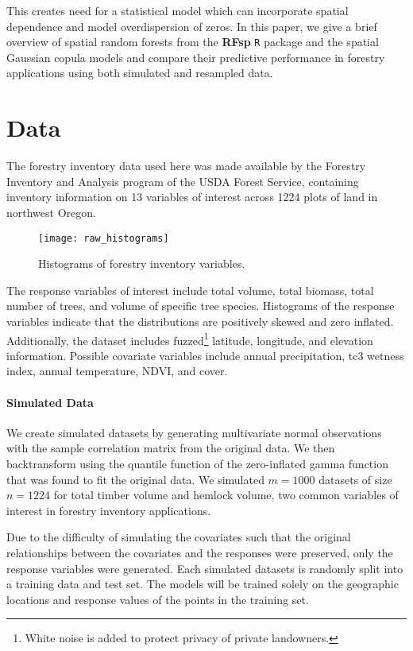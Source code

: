 \documentclass{article}
\begin{document}
This creates need for a statistical model which can incorporate spatial dependence and model overdispersion of zeros.
In this paper, we give a brief overview of spatial random forests from the \textbf{RFsp} \texttt{R} package\cite{hengl18} and the spatial Gaussian copula models\cite{madsen09} and compare their predictive performance in forestry applications using both simulated and resampled data.

\section{Data}

The forestry inventory data used here was made available by the Forestry Inventory and Analysis program of the USDA Forest Service, containing inventory information on 13 variables of interest across 1224 plots of land in northwest Oregon.

\begin{wrapfigure}{r}{.49\textwidth}
	\texttt{[image: raw\_histograms]}
	\caption{Histograms of forestry inventory variables.}
\end{wrapfigure}

The response variables of interest include total volume, total biomass, total number of trees, and volume of specific tree species.
Histograms of the response variables indicate that the distributions are positively skewed and zero inflated.
Additionally, the dataset includes fuzzed\footnote{White noise is added to protect privacy of private landowners.} latitude, longitude, and elevation information.
Possible covariate variables include annual precipitation, tc3 wetness index\cite{raynolds16}, annual temperature, NDVI, and cover.

\paragraph{Simulated Data} We create simulated datasets by generating multivariate normal observations with the sample correlation matrix from the original data.
We then backtransform using the quantile function of the zero-inflated gamma function that was found to fit the original data.
We simulated $m=1000$ datasets of size $n=1224$ for total timber volume and hemlock volume, two common variables of interest in forestry inventory applications.

Due to the difficulty of simulating the covariates such that the original relationships between the covariates and the responses were preserved, only the response variables were generated.
Each simulated datasets is randomly split into a training data and test set.
The models will be trained solely on the geographic locations and response values of the points in the training set.
\end{document}
